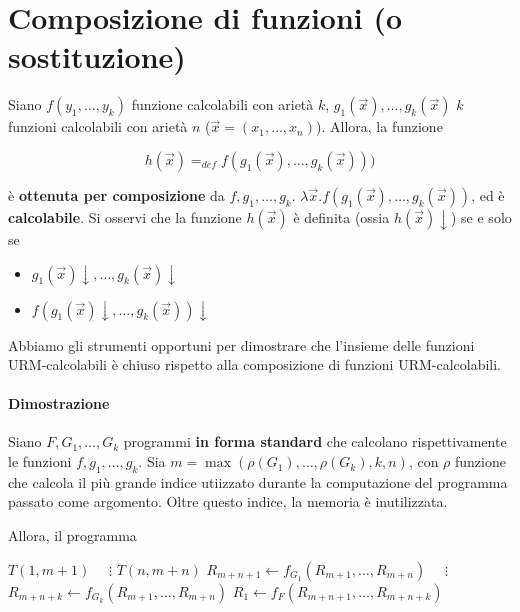 	
	\section{Composizione di funzioni (o sostituzione)}
	Siano $f(y_1, \dots, y_k)$ funzione calcolabili con arietà $k$, $g_1(\vec{x}), \dots, g_k(\vec{x})$ $k$ funzioni calcolabili con arietà $n$ ($\vec{x} = (x_1, \dots, x_n)$). Allora, la funzione
	
	$$
	h(\vec{x})=_{def}f(g_1(\vec{x}), \dots,g_k(\vec{x})))
	$$
	
	è \textbf{ottenuta per composizione} da $f,g_1,\dots,g_k$. $\lambda\vec{x}.f(g_1(\vec{x}), \dots, g_k(\vec{x}))$, ed è \textbf{calcolabile}. 
	Si osservi che la funzione $h(\vec{x})$ è definita (ossia $h(\vec{x})\downarrow$) se e solo se
	
	\begin{itemize}
		\item $g_1(\vec{x})\downarrow, \dots, g_k(\vec{x})\downarrow$
		\item $f(g_1(\vec{x})\downarrow, \dots, g_k(\vec{x}))\downarrow$
	\end{itemize}
	
	Abbiamo gli strumenti opportuni per dimostrare che l'insieme delle funzioni URM-calcolabili è chiuso rispetto alla composizione di funzioni URM-calcolabili.
	
	\paragraph{Dimostrazione}
	Siano $F, G_1, \dots, G_k$ programmi \textbf{in forma standard} che calcolano rispettivamente le funzioni $f, g_1, \dots, g_k$. Sia $m = \max(\rho(G_1), \dots, \rho(G_k), k, n)$, con $\rho$ funzione che calcola il più grande indice utiizzato durante la computazione del programma passato come argomento. Oltre questo indice, la memoria è inutilizzata.
	
	Allora, il programma 
\begin{algorithm}
	\caption{\textit{Composizione di funzioni}}
	\begin{algorithmic}
	\State $T(1, m+1)$
	\State $\quad \vdots$ 
	\State $T(n,m+n)$
	\State $R_{m+n+1} \gets f_{G_1}(R_{m+1}, \dots, R_{m+n})$
	\State $\quad \vdots$ 
	\State $R_{m+n+k} \gets f_{G_k}(R_{m+1}, \dots, R_{m+n})$
	\State $R_1 \gets f_{F}(R_{m+n+1}, \dots, R_{m+n+k})$ 
	\end{algorithmic}
\end{algorithm}

